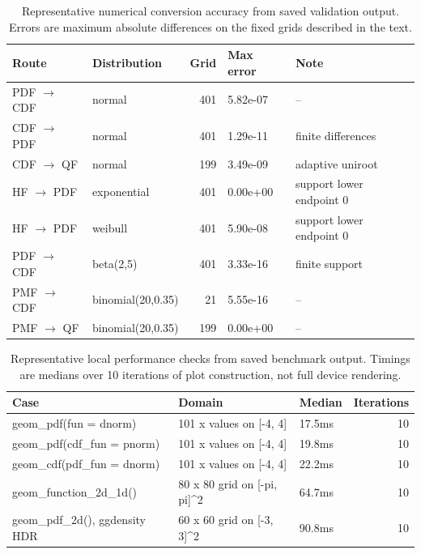 \begin{table}

\caption{\label{tab:technical-accuracy}Representative numerical conversion accuracy from saved validation output. Errors are maximum absolute differences on the fixed grids described in the text.}
\centering
\begin{tabular}[t]{l|l|r|l|l}
\hline
Route & Distribution & Grid & Max error & Note\\
\hline
PDF $\to$ CDF & normal & 401 & 5.82e-07 & --\\
\hline
CDF $\to$ PDF & normal & 401 & 1.29e-11 & finite differences\\
\hline
CDF $\to$ QF & normal & 199 & 3.49e-09 & adaptive uniroot\\
\hline
HF $\to$ PDF & exponential & 401 & 0.00e+00 & support lower endpoint 0\\
\hline
HF $\to$ PDF & weibull & 401 & 5.90e-08 & support lower endpoint 0\\
\hline
PDF $\to$ CDF & beta(2,5) & 401 & 3.33e-16 & finite support\\
\hline
PMF $\to$ CDF & binomial(20,0.35) & 21 & 5.55e-16 & --\\
\hline
PMF $\to$ QF & binomial(20,0.35) & 199 & 0.00e+00 & --\\
\hline
\end{tabular}
\end{table}

\begin{table}

\caption{\label{tab:technical-performance}Representative local performance checks from saved benchmark output. Timings are medians over 10 iterations of plot construction, not full device rendering.}
\centering
\begin{tabular}[t]{l|l|l|r}
\hline
Case & Domain & Median & Iterations\\
\hline
geom\_pdf(fun = dnorm) & 101 x values on [-4, 4] & 17.5ms & 10\\
\hline
geom\_pdf(cdf\_fun = pnorm) & 101 x values on [-4, 4] & 19.8ms & 10\\
\hline
geom\_cdf(pdf\_fun = dnorm) & 101 x values on [-4, 4] & 22.2ms & 10\\
\hline
geom\_function\_2d\_1d() & 80 x 80 grid on [-pi, pi]\textasciicircum{}2 & 64.7ms & 10\\
\hline
geom\_pdf\_2d(), ggdensity HDR & 60 x 60 grid on [-3, 3]\textasciicircum{}2 & 90.8ms & 10\\
\hline
\end{tabular}
\end{table}

